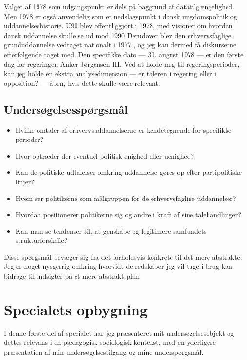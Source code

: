 Valget af 1978 som udgangspunkt er dels på baggrund af datatilgængelighed.
Men 1978 er også anvendelig som et nedslagspunkt i dansk ungdomspolitik og uddannelseshistorie.
U90 blev offentliggjort i 1978, med visioner om hvordan dansk uddannelse skulle se ud mod 1990 \autocite{undervisningsministeriet90SamletUddannelsesplanlaegning1978}
Derudover blev den erhvervsfaglige grunduddannelse vedtaget nationalt i 1977 \autocite{thewikipediavolunteersEFG2019}, og jeg kan dermed få diskurserne efterfølgende taget med.
Den specifikke dato — 30. august 1978 — er den første dag for regeringen Anker Jørgensen III.
Ved at holde mig til regeringsperioder, kan jeg holde en ekstra analysedimension — er taleren i regering eller i opposition? — åben, hvis dette skulle være relevant.

\section{Undersøgelsesspørgsmål}\label{seq:resqs}

\begin{itemize}
  \item
    Hvilke omtaler af erhvervsuddannelserne er kendetegnende for specifikke perioder?
  \item
    Hvor optræder der eventuel politisk enighed eller uenighed?
  \item
    Kan de politiske udtalelser omkring uddannelse gøres op efter partipolitiske linjer?
  \item
    Hvem ser politikerne som målgruppen for de erhvervsfaglige uddannelser?
  \item
    Hvordan positionerer politikerne sig og andre i kraft af sine talehandlinger?
  \item
    Kan man se tendenser til, at genskabe og legitimere samfundets strukturforskelle?
\end{itemize}

Disse spørgsmål bevæger sig fra det forholdsvis konkrete til det mere abstrakte.
Jeg er noget nysgerrig omkring hvorvidt de redskaber jeg vil tage i brug kan bidrage til indsigter på et mere abstrakt plan.

\chapter{Specialets opbygning}
I denne første del af specialet har jeg præsenteret mit undersøgelsesobjekt og dettes relevans i en pædagogisk sociologisk kontekst, med en yderligere præsentation af min undersøgelsestilgang og mine underspørgsmål.

